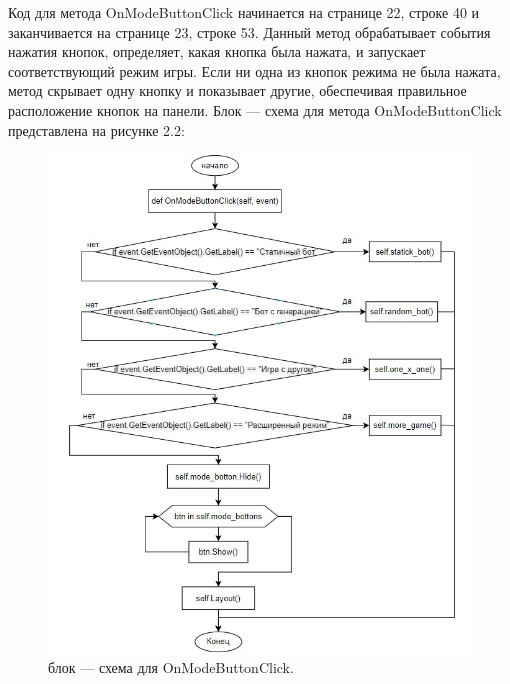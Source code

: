 Код для метода OnModeButtonClick начинается на странице 22, строке 40 и заканчивается на странице 23, строке 53. Данный метод обрабатывает события нажатия кнопок, определяет, какая кнопка была нажата, и запускает соответствующий режим игры. Если ни одна из кнопок режима не была нажата, метод скрывает одну кнопку и показывает другие, обеспечивая правильное расположение кнопок на панели.
Блок --- схема для метода OnModeButtonClick представлена на рисунке 2.2:
\begin{figure}[H]
\graphicspath{ {img/} }
\centering
\includegraphics[width = 15cm]{часть.jpg}
\caption{блок --- схема для OnModeButtonClick.}
\end{figure}

